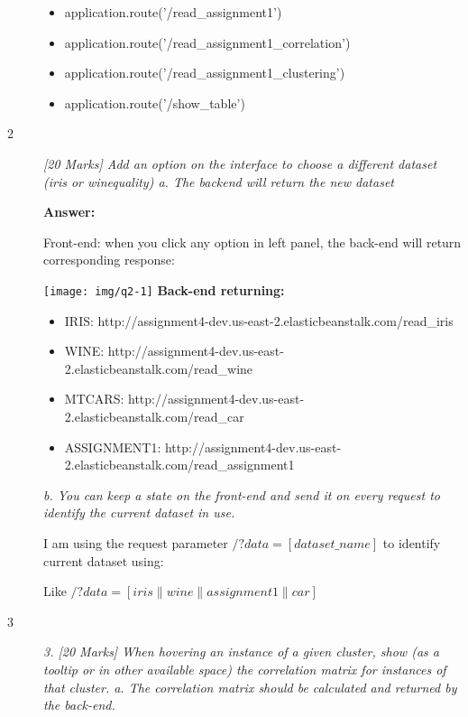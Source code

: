 \documentclass[]{report}
\begin{document}
\begin{description}
\begin{itemize}
\item application.route('/read\_assignment1')

\item application.route('/read\_assignment1\_correlation')

\item application.route('/read\_assignment1\_clustering')

\item application.route('/show\_table')


\end{itemize}


\item[2]
{\em [20 Marks] Add an option on the interface to choose a different dataset (iris or winequality)
a.	The backend will return the new dataset}

\textbf{Answer:}

Front-end: when you click any option in left panel, the back-end will return corresponding response:

\texttt{[image: img/q2-1]}
\bigbreak
\textbf{Back-end returning:}

\begin{itemize}
\item IRIS: http://assignment4-dev.us-east-2.elasticbeanstalk.com/read\_iris

\item WINE: http://assignment4-dev.us-east-2.elasticbeanstalk.com/read\_wine 

\item MTCARS: http://assignment4-dev.us-east-2.elasticbeanstalk.com/read\_car

\item ASSIGNMENT1: http://assignment4-dev.us-east-2.elasticbeanstalk.com/read\_assignment1

\end{itemize}

{\em b.	You can keep a state on the front-end and send it on every request to identify the current dataset in use.}

I am using the request parameter $ /?data=[dataset\_name]$ to identify current dataset using:

Like $ /?data=[iris\|wine\|assignment1\|car] $
\item[3]
{\em 3.	[20 Marks] When hovering an instance of a given cluster, show (as a tooltip or in other available space) the correlation matrix for instances of that cluster.
	a.	The correlation matrix should be calculated and returned by the back-end.
}



\end{description}
\end{document}
